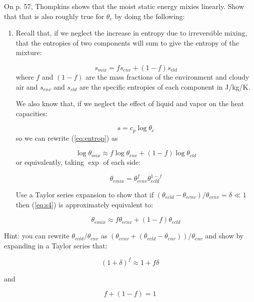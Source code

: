 \documentclass[12pt]{article}
\begin{document}
\newcommand{\vect}[1]{\boldsymbol{\vec{#1}}}
\pagestyle{first}

On p. 57, Thompkins shows that the moist static energy mixies linearly.
Show that that is also roughly true for $\theta_e$ by doing the following:


\begin{enumerate}
\item Recall that, if we neglect the increase in entropy due to irreversible mixing,
that the entropies of two components will sum to give the entropy of the mixture:

\begin{equation}
  \label{eq:entrop}
  s_{mix} = f s_{env}  + (1-f) s_{cld}
\end{equation}
where $f$ and $(1-f)$ are the mass fractions of the environment and cloudy air and $s_{env}$ and $s_{cld}$ are the specific entropies
of each component in J/kg/K.

We also know that, if we neglect the effect of liquid and vapor on the heat capacities:

\begin{equation}
  \label{eq:S2}
  s = c_p \log \theta_e
\end{equation}
so we can rewrite (\ref{eq:entrop}) as

\begin{equation}
  \label{eq:s3}
 \log \theta_{mix} \approx f \log \theta_{env} + (1 - f) \log \theta_{cld}
\end{equation}
or equivalently, taking $\exp$ of each side:

\begin{equation}
  \label{eq:s4}
 \theta_{emix} = \theta_{eenv}^f \theta_{ecld}^{1-f}
\end{equation}

Use a Taylor series expansion to show that if $(\theta_{ecld} - \theta_{eenv})/\theta_{eenv} = \delta \ll 1$ 
then (\ref{eq:s4}) is approximately equivalent to:

\begin{equation}
  \label{eq:s5}
 \theta_{emix} \approx f \theta_{eenv} + (1 -f) \theta_{ecld}
\end{equation}


\end{enumerate}

Hint:  you can rewrite $\theta_{ecld}/\theta_{env}$ as $(\theta_{eenv} + (\theta_{ecld} - \theta_{env}))/\theta_{env}$ and
show by expanding in a Taylor series that:

\begin{equation}
  \label{eq:taylor}
  (1 + \delta)^f \approx 1 + f \delta
\end{equation}


and

\begin{equation}
  \label{eq:taylor2}
  f + (1-f) = 1
\end{equation}
\end{document}
